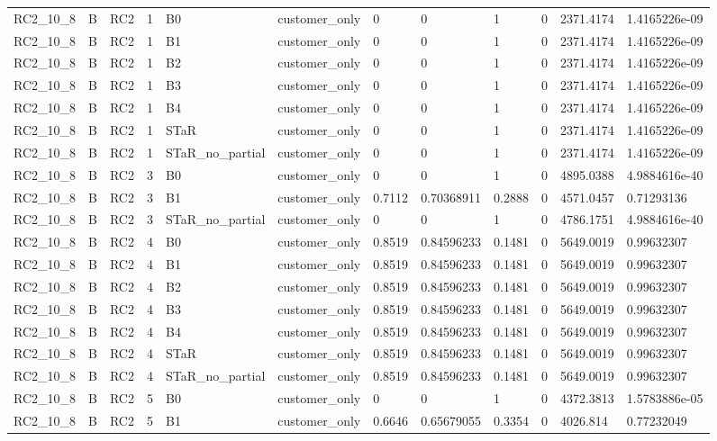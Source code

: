 \begin{longtable}{llllllllllll}
RC2\_10\_8 & B & RC2 & 1 & B0 & customer\_only & 0 & 0 & 1 & 0 & 2371.4174 & 1.4165226e-09 \\
RC2\_10\_8 & B & RC2 & 1 & B1 & customer\_only & 0 & 0 & 1 & 0 & 2371.4174 & 1.4165226e-09 \\
RC2\_10\_8 & B & RC2 & 1 & B2 & customer\_only & 0 & 0 & 1 & 0 & 2371.4174 & 1.4165226e-09 \\
RC2\_10\_8 & B & RC2 & 1 & B3 & customer\_only & 0 & 0 & 1 & 0 & 2371.4174 & 1.4165226e-09 \\
RC2\_10\_8 & B & RC2 & 1 & B4 & customer\_only & 0 & 0 & 1 & 0 & 2371.4174 & 1.4165226e-09 \\
RC2\_10\_8 & B & RC2 & 1 & STaR & customer\_only & 0 & 0 & 1 & 0 & 2371.4174 & 1.4165226e-09 \\
RC2\_10\_8 & B & RC2 & 1 & STaR\_no\_partial & customer\_only & 0 & 0 & 1 & 0 & 2371.4174 & 1.4165226e-09 \\
RC2\_10\_8 & B & RC2 & 3 & B0 & customer\_only & 0 & 0 & 1 & 0 & 4895.0388 & 4.9884616e-40 \\
RC2\_10\_8 & B & RC2 & 3 & B1 & customer\_only & 0.7112 & 0.70368911 & 0.2888 & 0 & 4571.0457 & 0.71293136 \\
RC2\_10\_8 & B & RC2 & 3 & STaR\_no\_partial & customer\_only & 0 & 0 & 1 & 0 & 4786.1751 & 4.9884616e-40 \\
RC2\_10\_8 & B & RC2 & 4 & B0 & customer\_only & 0.8519 & 0.84596233 & 0.1481 & 0 & 5649.0019 & 0.99632307 \\
RC2\_10\_8 & B & RC2 & 4 & B1 & customer\_only & 0.8519 & 0.84596233 & 0.1481 & 0 & 5649.0019 & 0.99632307 \\
RC2\_10\_8 & B & RC2 & 4 & B2 & customer\_only & 0.8519 & 0.84596233 & 0.1481 & 0 & 5649.0019 & 0.99632307 \\
RC2\_10\_8 & B & RC2 & 4 & B3 & customer\_only & 0.8519 & 0.84596233 & 0.1481 & 0 & 5649.0019 & 0.99632307 \\
RC2\_10\_8 & B & RC2 & 4 & B4 & customer\_only & 0.8519 & 0.84596233 & 0.1481 & 0 & 5649.0019 & 0.99632307 \\
RC2\_10\_8 & B & RC2 & 4 & STaR & customer\_only & 0.8519 & 0.84596233 & 0.1481 & 0 & 5649.0019 & 0.99632307 \\
RC2\_10\_8 & B & RC2 & 4 & STaR\_no\_partial & customer\_only & 0.8519 & 0.84596233 & 0.1481 & 0 & 5649.0019 & 0.99632307 \\
RC2\_10\_8 & B & RC2 & 5 & B0 & customer\_only & 0 & 0 & 1 & 0 & 4372.3813 & 1.5783886e-05 \\
RC2\_10\_8 & B & RC2 & 5 & B1 & customer\_only & 0.6646 & 0.65679055 & 0.3354 & 0 & 4026.814 & 0.77232049 \\

\end{longtable}
